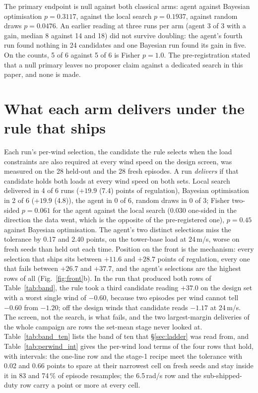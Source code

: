 \documentclass{article}
\begin{document}
The primary endpoint is null against both classical arms: agent against Bayesian optimisation $p = 0.3117$, against the local search $p = 0.1937$, against random draws $p = 0.0476$. An earlier reading at three runs per arm (agent 3 of 3 with a gain, median 8 against 14 and 18) did not survive doubling: the agent's fourth run found nothing in 24 candidates and one Bayesian run found its gain in five. On the counts, 5 of 6 against 5 of 6 is Fisher $p = 1.0$. The pre-registration stated that a null primary leaves no proposer claim against a dedicated search in this paper, and none is made.

\section{What each arm delivers under the rule that ships}
\label{app:delivery}
Each run's per-wind selection, the candidate the rule selects when the load constraints are also required at every wind speed on the design screen, was measured on the 28 held-out and the 28 fresh episodes. A run \emph{delivers} if that candidate holds both loads at every wind speed on both sets. Local search delivered in 4 of 6 runs ($+19.9$ (7.4) points of regulation), Bayesian optimisation in 2 of 6 ($+19.9$ (4.8)), the agent in 0 of 6, random draws in 0 of 3; Fisher two-sided $p = 0.061$ for the agent against the local search (0.030 one-sided in the direction the data went, which is the opposite of the pre-registered one), $p = 0.45$ against Bayesian optimisation. The agent's two distinct selections miss the tolerance by 0.17 and 2.40 points, on the tower-base load at 24\,m/s, worse on fresh seeds than held out each time. Position on the front is the mechanism: every selection that ships sits between $+11.6$ and $+28.7$ points of regulation, every one that fails between $+26.7$ and $+37.7$, and the agent's selections are the highest rows of all (Fig.~\ref{fig:front}b). In the run that produced both rows of Table~\ref{tab:band}, the rule took a third candidate reading $+37.0$ on the design set with a worst single wind of $-0.60$, because two episodes per wind cannot tell $-0.60$ from $-1.20$; off the design winds that candidate reads $-1.17$ at 24\,m/s. The screen, not the search, is what fails, and the two largest-margin deliveries of the whole campaign are rows the set-mean stage never looked at. Table~\ref{tab:band_ten} lists the band of ten that §\ref{sec:ladder} was read from, and Table~\ref{tab:perwind_int} gives the per-wind load terms of the four rows that hold, with intervals: the one-line row and the stage-1 recipe meet the tolerance with 0.02 and 0.66 points to spare at their narrowest cell on fresh seeds and stay inside it in 83 and 74\,\% of episode resamples; the 6.5\,rad/s row and the sub-shipped-duty row carry a point or more at every cell.
\end{document}
